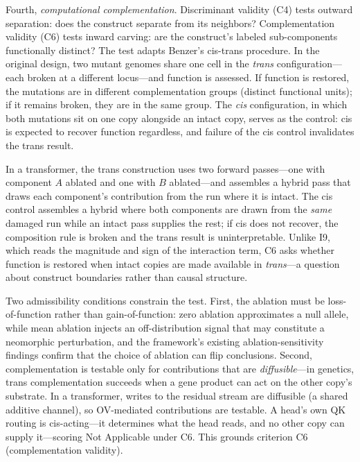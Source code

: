 \documentclass{article}
\begin{document}
Fourth, \emph{computational complementation}. Discriminant validity (C4) tests outward separation: does the construct separate from its neighbors? Complementation validity (C6) tests inward carving: are the construct's labeled sub-components functionally distinct? The test adapts Benzer's cis-trans procedure. In the original design, two mutant genomes share one cell in the \emph{trans} configuration---each broken at a different locus---and function is assessed. If function is restored, the mutations are in different complementation groups (distinct functional units); if it remains broken, they are in the same group. The \emph{cis} configuration, in which both mutations sit on one copy alongside an intact copy, serves as the control: cis is expected to recover function regardless, and failure of the cis control invalidates the trans result.

In a transformer, the trans construction uses two forward passes---one with component $A$ ablated and one with $B$ ablated---and assembles a hybrid pass that draws each component's contribution from the run where it is intact. The cis control assembles a hybrid where both components are drawn from the \emph{same} damaged run while an intact pass supplies the rest; if cis does not recover, the composition rule is broken and the trans result is uninterpretable. Unlike I9, which reads the magnitude and sign of the interaction term, C6 asks whether function is restored when intact copies are made available in \emph{trans}---a question about construct boundaries rather than causal structure.

Two admissibility conditions constrain the test. First, the ablation must be loss-of-function rather than gain-of-function: zero ablation approximates a null allele, while mean ablation injects an off-distribution signal that may constitute a neomorphic perturbation, and the framework's existing ablation-sensitivity findings confirm that the choice of ablation can flip conclusions. Second, complementation is testable only for contributions that are \emph{diffusible}---in genetics, trans complementation succeeds when a gene product can act on the other copy's substrate. In a transformer, writes to the residual stream are diffusible (a shared additive channel), so OV-mediated contributions are testable. A head's own QK routing is cis-acting---it determines what the head reads, and no other copy can supply it---scoring Not Applicable under C6. This grounds criterion C6 (complementation validity).
\end{document}
